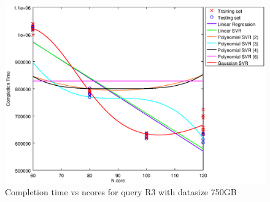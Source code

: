 
\begin {figure}[hbtp]
\centering
\includegraphics[width=\textwidth]{output/R3_750_ONLY_1_LINEAR_NCORE/plot_R3_750.eps}
\caption{Completion time vs ncores for query R3 with datasize 750GB}
\label{fig:only_1_linear_R3_750}
\end {figure}
